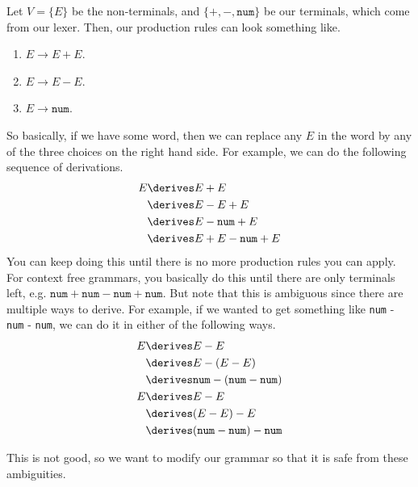   \begin{example}
    Let $V = \{E\}$ be the non-terminals, and $\{+, -, \texttt{num}\}$ be our terminals, which come from our lexer. Then, our production rules can look something like. 
    \begin{enumerate}
      \item $E \to E + E$. 
      \item $E \to E - E$. 
      \item $E \to \texttt{num}$. 
    \end{enumerate}
    So basically, if we have some word, then we can replace any $E$ in the word by any of the three choices on the right hand side. For example, we can do the following sequence of derivations. 
    \begin{align}
      E & \derives E + E \\ 
        & \derives E - E + E \\
        & \derives E - \texttt{num} + E\\
        & \derives E + E - \texttt{num} + E 
    \end{align}
    You can keep doing this until there is no more production rules you can apply. For context free grammars, you basically do this until there are only terminals left, e.g. $\texttt{num} + \texttt{num} - \texttt{num} + \texttt{num}$. But note that this is ambiguous since there are multiple ways to derive. For example, if we wanted to get something like \texttt{num} - \texttt{num} - \texttt{num}, we can do it in either of the following ways. 
    \begin{align}
      E & \derives E - E \\ 
        & \derives E - (E - E) \\ 
        & \derives \texttt{num} - (\texttt{num} - \texttt{num}) \\
      E & \derives E - E \\ 
        & \derives (E - E) - E \\ 
        & \derives (\texttt{num} - \texttt{num}) - \texttt{num} 
    \end{align}
  \end{example}

  This is not good, so we want to modify our grammar so that it is safe from these ambiguities. 

